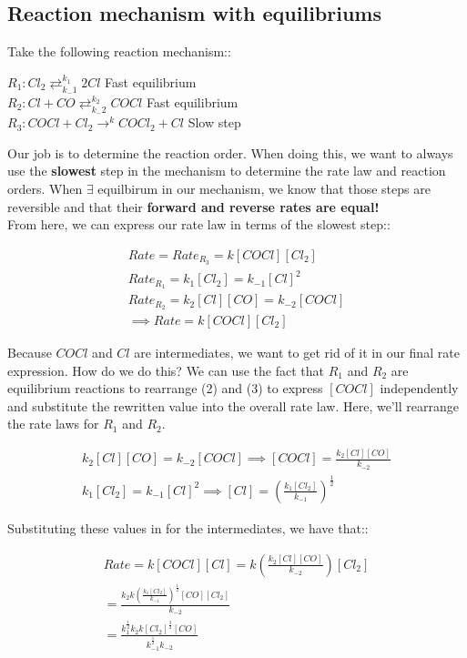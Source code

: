 \documentclass[12pt]{book}
\begin{document}
\subsection*{Reaction mechanism with equilibriums}

Take the following reaction mechanism::

\begin{center}
    $R_1:Cl_2\rightleftarrows_{k_-1}^{k_1} 2Cl$ Fast equilibrium\\
    $R_2:Cl+CO\rightleftarrows_{k_-2}^{k_2} COCl$ \indent Fast equilibrium\\
    $R_3:COCl+Cl_2\rightarrow^k COCl_2+Cl$ \indent Slow step
\end{center}

Our job is to determine the reaction order. When doing this, we want to always use the \textbf{slowest} step in the mechanism to determine the rate law and reaction orders. When $\exists$ equilbirum in our mechanism, we know that those steps are reversible and that their \textbf{forward and reverse rates are equal!}\\ From here, we can express our rate law in terms of the slowest step::

\begin{align}
    Rate=Rate_{R_3}=k[COCl][Cl_2]\\
    Rate_{R_1}=k_1[Cl_2]=k_{-1}[Cl]^2\\
    Rate_{R_2}=k_2[Cl][CO]=k_{-2}[COCl]\\
    \implies Rate=k[COCl][Cl_2]
\end{align}

Because $COCl$ and $Cl$ are intermediates, we want to get rid of it in our final rate expression. How do we do this? We can use the fact that $R_1$ and $R_2$ are equilibrium reactions to rearrange (2) and (3) to express $[COCl]$ independently and substitute the rewritten value into the overall rate law. Here, we'll rearrange the rate laws for $R_1$ and $R_2$.

\begin{align}
    k_2[Cl][CO]=k_{-2}[COCl]\implies [COCl]=\frac{k_2[Cl][CO]}{k_{-2}}\\
    k_1[Cl_2]=k_{-1}[Cl]^2\implies [Cl]=\left(\frac{k_1[Cl_2]}{k_{-1}}\right)^{\frac{1}{2}}
\end{align}

Substituting these values in for the intermediates, we have that::

\begin{align}
    Rate=k[COCl][Cl]=k\left(\frac{k_2[Cl][CO]}{k_{-2}}\right)[Cl_2]\\=\frac{k_2k\left(\frac{k_1[Cl_2]}{k_{-1}}\right)^{\frac{1}{2}}[CO][Cl_2]}{k_{-2}}\\=\frac{k_1^{\frac{1}{2}}k_2k[Cl_2]^{\frac{3}{2}}[CO]}{k_{-1}^{\frac{1}{2}}k_{-2}}
\end{align}
\end{document}
